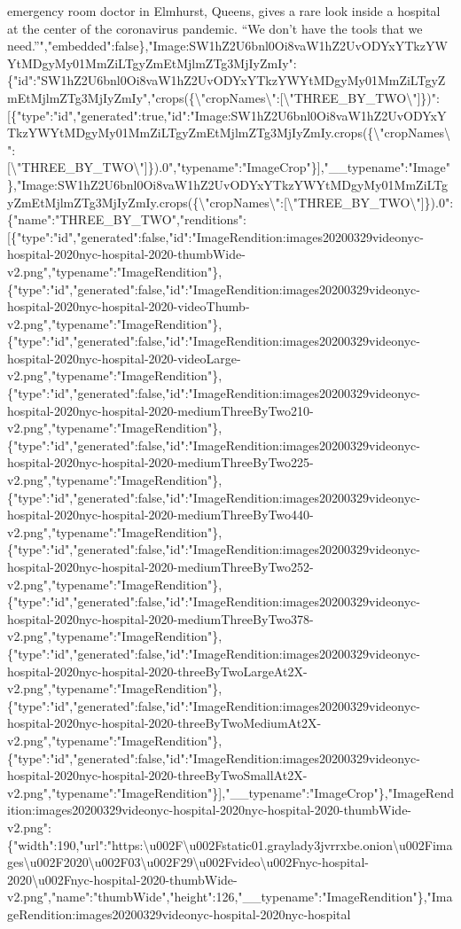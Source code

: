 emergency room doctor in Elmhurst, Queens, gives a rare look inside a
hospital at the center of the coronavirus pandemic. ``We don't have the
tools that we
need.''","embedded":false\},"Image:SW1hZ2U6bnl0Oi8vaW1hZ2UvODYxYTkzYWYtMDgyMy01MmZiLTgyZmEtMjlmZTg3MjIyZmIy":\{"id":"SW1hZ2U6bnl0Oi8vaW1hZ2UvODYxYTkzYWYtMDgyMy01MmZiLTgyZmEtMjlmZTg3MjIyZmIy","crops(\{\textbackslash{}"cropNames\textbackslash{}":{[}\textbackslash{}"THREE\_BY\_TWO\textbackslash{}"{]}\})":{[}\{"type":"id","generated":true,"id":"Image:SW1hZ2U6bnl0Oi8vaW1hZ2UvODYxYTkzYWYtMDgyMy01MmZiLTgyZmEtMjlmZTg3MjIyZmIy.crops(\{\textbackslash{}"cropNames\textbackslash{}":{[}\textbackslash{}"THREE\_BY\_TWO\textbackslash{}"{]}\}).0","typename":"ImageCrop"\}{]},"\_\_typename":"Image"\},"Image:SW1hZ2U6bnl0Oi8vaW1hZ2UvODYxYTkzYWYtMDgyMy01MmZiLTgyZmEtMjlmZTg3MjIyZmIy.crops(\{\textbackslash{}"cropNames\textbackslash{}":{[}\textbackslash{}"THREE\_BY\_TWO\textbackslash{}"{]}\}).0":\{"name":"THREE\_BY\_TWO","renditions":{[}\{"type":"id","generated":false,"id":"ImageRendition:images20200329videonyc-hospital-2020nyc-hospital-2020-thumbWide-v2.png","typename":"ImageRendition"\},\{"type":"id","generated":false,"id":"ImageRendition:images20200329videonyc-hospital-2020nyc-hospital-2020-videoThumb-v2.png","typename":"ImageRendition"\},\{"type":"id","generated":false,"id":"ImageRendition:images20200329videonyc-hospital-2020nyc-hospital-2020-videoLarge-v2.png","typename":"ImageRendition"\},\{"type":"id","generated":false,"id":"ImageRendition:images20200329videonyc-hospital-2020nyc-hospital-2020-mediumThreeByTwo210-v2.png","typename":"ImageRendition"\},\{"type":"id","generated":false,"id":"ImageRendition:images20200329videonyc-hospital-2020nyc-hospital-2020-mediumThreeByTwo225-v2.png","typename":"ImageRendition"\},\{"type":"id","generated":false,"id":"ImageRendition:images20200329videonyc-hospital-2020nyc-hospital-2020-mediumThreeByTwo440-v2.png","typename":"ImageRendition"\},\{"type":"id","generated":false,"id":"ImageRendition:images20200329videonyc-hospital-2020nyc-hospital-2020-mediumThreeByTwo252-v2.png","typename":"ImageRendition"\},\{"type":"id","generated":false,"id":"ImageRendition:images20200329videonyc-hospital-2020nyc-hospital-2020-mediumThreeByTwo378-v2.png","typename":"ImageRendition"\},\{"type":"id","generated":false,"id":"ImageRendition:images20200329videonyc-hospital-2020nyc-hospital-2020-threeByTwoLargeAt2X-v2.png","typename":"ImageRendition"\},\{"type":"id","generated":false,"id":"ImageRendition:images20200329videonyc-hospital-2020nyc-hospital-2020-threeByTwoMediumAt2X-v2.png","typename":"ImageRendition"\},\{"type":"id","generated":false,"id":"ImageRendition:images20200329videonyc-hospital-2020nyc-hospital-2020-threeByTwoSmallAt2X-v2.png","typename":"ImageRendition"\}{]},"\_\_typename":"ImageCrop"\},"ImageRendition:images20200329videonyc-hospital-2020nyc-hospital-2020-thumbWide-v2.png":\{"width":190,"url":"https:\textbackslash{}u002F\textbackslash{}u002Fstatic01.graylady3jvrrxbe.onion\textbackslash{}u002Fimages\textbackslash{}u002F2020\textbackslash{}u002F03\textbackslash{}u002F29\textbackslash{}u002Fvideo\textbackslash{}u002Fnyc-hospital-2020\textbackslash{}u002Fnyc-hospital-2020-thumbWide-v2.png","name":"thumbWide","height":126,"\_\_typename":"ImageRendition"\},"ImageRendition:images20200329videonyc-hospital-2020nyc-hospital